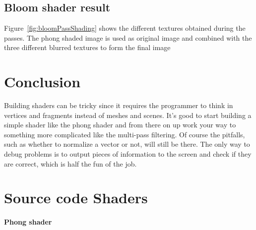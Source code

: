 \documentclass[a4paper,12pt]{article}
\begin{document}
\subsection{Bloom shader result}
\label{sec:bloomShaderResult}
Figure~\ref{fig:bloomPassShading} shows the different textures obtained during the passes. The phong shaded image is used as original image and combined with the three different blurred textures to form the final image

\section{Conclusion}
\label{sec:Conclusion}
Building shaders can be tricky since it requires the programmer to think in vertices and fragments instead of meshes and scenes. It's good to start building a simple shader like the phong shader and from there on up work your way to something more complicated like the multi-pass filtering. Of course the pitfalls, such as whether to normalize a vector or not, will still be there. The only way to debug problems is to output pieces of information to the screen and check if they are correct, which is half the fun of the job.

\pagebreak[4]

\section{Source code Shaders}
\label{sec:SourceCodeShaders}

\paragraph{Phong shader}
\label{sec:PhongShaderSource}
\end{document}
